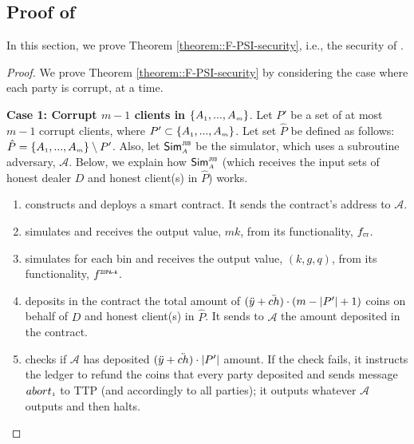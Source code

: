 

\subsection{Proof of \fpsi}\label{sec::F-PSI-proof}



In this section, we prove Theorem \ref{theorem::F-PSI-security}, i.e., the security of \fpsi. 


\begin{proof}
%
We prove Theorem  \ref{theorem::F-PSI-security} by considering the case where each party is corrupt, at a time.

\noindent\textbf{Case 1: Corrupt $m-1$ clients in $\{  {  A}_{ \scriptscriptstyle {   1}}, ...,   {  A}_{ \scriptscriptstyle {   m}}\}$}.  Let $P'$ be a set of at most $m-1$ corrupt clients, where $P'\subset \{  {  A}_{ \scriptscriptstyle {   1}}, ...,   {  A}_{ \scriptscriptstyle {   m}}\}$. Let set $\hat P$ be defined as follows: $\hat P=\{  {  A}_{ \scriptscriptstyle {   1}}, ...,   {  A}_{ \scriptscriptstyle {   m}}\}\setminus P'$. Also, let $\mathsf{Sim}^{\scriptscriptstyle\mathtt{JUS}}_{\scriptscriptstyle A}$ be the simulator, which uses a subroutine adversary, $\mathcal{A}$.  Below, we explain how $\mathsf{Sim}^{\scriptscriptstyle \mathtt{JUS}}_{\scriptscriptstyle A}$ (which receives the input sets of honest dealer $D$ and honest client(s) in $\hat P$) works. 


\begin{enumerate}
%
\item constructs and deploys a smart contract. It sends the contract's address to $\mathcal{A}$. 
%
\item simulates \ct and receives the output value, $ {mk}$, from its functionality, $f_{\scriptscriptstyle \mathtt{CT}}$.
%
\item\label{sim::ZSPA-A-invocation} simulates \zspaa for each bin and receives the output value, $( k,  g,  q)$, from its functionality, $f^{\scriptscriptstyle \mathtt{ZSPA\text{-}A}}$.
%
\item deposits in the contract the total amount of $(\ddot{y}+\ddot{ch})\cdot (m-|P'|+1)$ coins on behalf of $D$ and honest client(s) in $\hat P$. It sends to $\mathcal{A}$ the amount deposited in the contract. 
%
\item checks if $\mathcal{A}$ has deposited $(\ddot{y}+\ddot{ch})\cdot |P'|$ amount. If the check fails, it instructs the ledger to refund the coins that every party deposited and sends message $abort_{\scriptscriptstyle 1}$ to TTP (and accordingly to all parties); it outputs whatever $\mathcal{A}$ outputs and then halts. 


\end{enumerate}
\end{proof}
